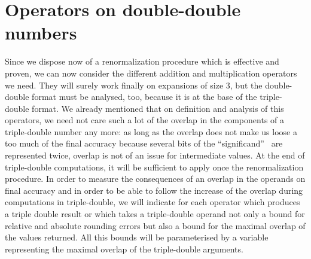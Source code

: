 \documentclass[a4paper,10pt,twoside]{article}
\newcommand{\ouvguill}{``}
\newcommand{\fermguill}{''}
\begin{document}
\section{Operators on double-double numbers}
Since we dispose now of a renormalization procedure which is effective and
proven, we can now consider the different addition and multiplication
operators we need. They will surely work finally on expansions of size $3$,
but the double-double format \cite{Dek71} must be analysed, too, because it is at the base
of the triple-double format. We already mentioned that on definition and
analysis of this operators, we need not care such a lot of the overlap in the
components of a triple-double number any more: as long as the overlap does
not make us loose a too much of the final accuracy because several bits of the
\ouvguill significand\fermguill~ are represented twice, overlap is not of an
issue for intermediate values. At the end of triple-double computations, it
will be sufficient to apply once the renormalization procedure. In order to
measure the consequences of an overlap in the operands on final accuracy and
in order to be able to follow the increase of the overlap during computations
in triple-double, we will indicate for each operator which produces a triple
double result or which takes a triple-double operand not only a bound for
relative and absolute rounding errors but also a bound for the maximal overlap
of the values returned. All this bounds will be parameterised by a variable
representing the maximal overlap of the triple-double arguments.
\end{document}
